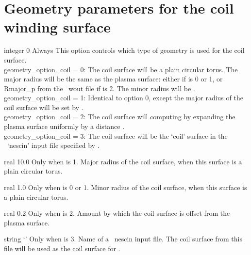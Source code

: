 \section{Geometry parameters for the coil winding surface}

{integer}
{0}
{Always}
{This option controls which type of geometry is used for the coil surface.\\

{\ttfamily geometry\_option\_coil} = 0: The coil surface will be a plain circular torus. The major radius will be the 
same as the plasma surface: either  if  is 0 or 1, or {\ttfamily Rmajor\_p} from the \vmec~{\ttfamily wout} file
if   is 2.
     The minor radius will be .\\

{\ttfamily geometry\_option\_coil} = 1: Identical to option 0, except the major radius of the coil surface will be set by .\\

{\ttfamily geometry\_option\_coil} = 2: The coil surface will computing by expanding the plasma surface uniformly by a distance .\\

{\ttfamily geometry\_option\_coil} = 3: The coil surface will be the `coil' surface in the \nescoil~`nescin' input file specified by .
}

\myhrule

{real}
{10.0}
{Only when  is 1.}
{Major radius of the coil surface, when this surface is a plain circular torus.}

\myhrule

{real}
{1.0}
{Only when  is 0 or 1.}
{Minor radius of the coil surface, when this surface is a plain circular torus.}


\myhrule

{real}
{0.2}
{Only when  is 2.}
{Amount by which the coil surface is offset from the plasma surface.}

\myhrule

{string}
{`'}
{Only when  is 3.}
{Name of a \nescoil~{\ttfamily nescin} input file. The coil surface from
this file will be used as the coil surface for \regcoil.}


